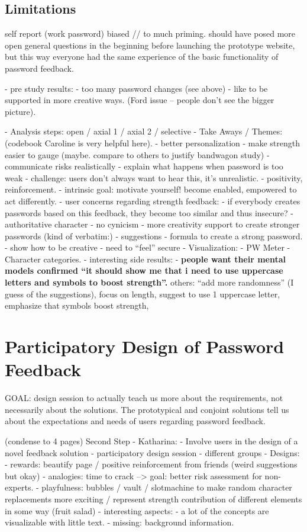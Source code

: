 \subsection{Limitations}
self report (work password) 
biased // to much priming. should have posed more open general questions in the beginning before launching the prototype website, but this way everyone had the same experience of the basic functionality of password feedback. 

- pre study results:
- too many password changes (see above)
- like to be supported in more creative ways. (Ford issue -- people don't see the bigger picture).



- Analysis steps: open / axial 1 / axial 2 / selective
- Take Aways / Themes: (codebook Caroline is very helpful here).
	- better personalization
	- make strength easier to gauge (maybe. compare to others to justify bandwagon study)
		- communicate risks realistically
		- explain what happens when password is too weak
			- challenge: users don't always want to hear this, it's unrealistic.
			- positivity, reinforcement.
			- intrinsic goal: motivate yourself! become enabled, empowered to act differently.
	- user concerns regarding strength feedback:
		- if everybody creates passwords based on this feedback, they become too similar and thus insecure?
		- authoritative character
		- no cynicism
	- more creativity support to create stronger passwords (kind of verbatim:)
		- suggestions
		- formula to create a strong password. 
		- show how to be creative 
		- need to ``feel'' secure
	- Visualization:
		- PW Meter
		- Character categories.
	- interesting side results: 
		- \textbf{people want their mental models confirmed ``it should show me that i need to use uppercase letters and symbols to boost strength''.} others: ``add more randomness'' (I guess of the suggestions), focus on length, suggest to use 1 uppercase letter, emphasize that symbols boost strength, 
		
\section{Participatory Design of Password Feedback}
GOAL: design session to actually teach us more about the requirements, not necessarily about the solutions. The prototypical and conjoint solutions tell us about the expectations and needs of users regarding password feedback. 

(condense to 4 pages)
Second Step - Katharina: 
- Involve users in the design of a novel feedback solution
	- participatory design session
	- different groups
- Designs:
	- rewards: beautify page / positive reinforcement from friends (weird suggestions but okay)
	- analogies: time to crack --> goal: better risk assessment for non-experts.
	- playfulness: bubbles / vault / slotmachine to make random character replacements more exciting / represent strength contribution of different elements in some way (fruit salad)
- interesting aspects:
	- a lot of the concepts are visualizable with little text.
	- missing: background information.
	
